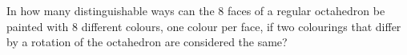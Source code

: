 In how many distinguishable ways can the $8$ faces of a regular octahedron be painted with $8$ different colours, one colour per face, if two colourings that differ by a rotation of the octahedron are considered the same?
